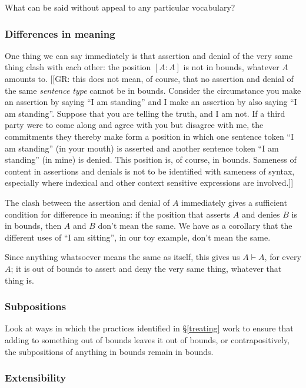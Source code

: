 \documentclass{article}
\newcommand{\pos}[2]{\ensuremath{[#1:#2]}}
\newcommand{\cns}{\vdash}
\begin{document}
What can be said without appeal to any particular vocabulary?


\subsubsection{Differences in meaning} \label{identity}

One thing we can say immediately is that assertion and denial of the very same thing clash with each other: the position $\pos{A}{A}$ is not in bounds, whatever $A$ amounts to. [[GR: this does not mean, of course, that no assertion and denial of the same \emph{sentence type} cannot be in bounds. Consider the circumstance you make an assertion by saying ``I am standing'' and I make an assertion by also saying ``I am standing''. Suppose that you are telling the truth, and I am not. If a third party were to come along and agree with you but disagree with me, the commitments they thereby make form a position in which one sentence token ``I am standing'' (in your mouth) is asserted and another sentence token ``I am standing'' (in mine) is denied. This position is, of course, in bounds. Sameness of content in assertions and denials is not to be identified with sameness of syntax, especially where indexical and other context sensitive expressions are involved.]] 

The clash between the assertion and denial of $A$ immediately gives a sufficient condition for difference in meaning: if the position that asserts $A$ and denies $B$ is in bounds, then $A$ and $B$ don't mean the same. We have as a corollary that the different uses of ``I am sitting'', in our toy example, don't mean the same. 

Since anything whatsoever means the same as itself, this gives us $A \cns A$, for every $A$; it is out of bounds to assert and deny the very same thing, whatever that thing is.


\subsubsection{Subpositions} \label{weakening}

Look at ways in which the practices identified in \S\ref{treating} work to ensure that adding to something out of bounds leaves it out of bounds, or contrapositively, the subpositions of anything in bounds remain in bounds.

\subsubsection{Extensibility} \label{cut}
\end{document}
